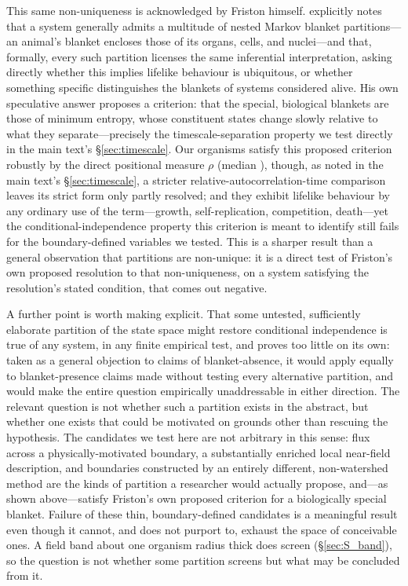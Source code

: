 \documentclass[11pt]{article}
\begin{document}
This same non-uniqueness is acknowledged by Friston himself. \citet{Friston2013} explicitly notes that a system generally admits a multitude of nested Markov blanket partitions---an animal's blanket encloses those of its organs, cells, and nuclei---and that, formally, every such partition licenses the same inferential interpretation, asking directly whether this implies lifelike behaviour is ubiquitous, or whether something specific distinguishes the blankets of systems considered alive. His own speculative answer proposes a criterion: that the special, biological blankets are those of minimum entropy, whose constituent states change slowly relative to what they separate---precisely the timescale-separation property we test directly in the main text's \S\ref{sec:timescale}. Our organisms satisfy this proposed criterion robustly by the direct positional measure $\rho$ (median ), though, as noted in the main text's \S\ref{sec:timescale}, a stricter relative-autocorrelation-time comparison leaves its strict form only partly resolved; and they exhibit lifelike behaviour by any ordinary use of the term---growth, self-replication, competition, death---yet the conditional-independence property this criterion is meant to identify still fails for the boundary-defined variables we tested. This is a sharper result than a general observation that partitions are non-unique: it is a direct test of Friston's own proposed resolution to that non-uniqueness, on a system satisfying the resolution's stated condition, that comes out negative.

A further point is worth making explicit. That some untested, sufficiently elaborate partition of the state space might restore conditional independence is true of any system, in any finite empirical test, and proves too little on its own: taken as a general objection to claims of blanket-absence, it would apply equally to blanket-presence claims made without testing every alternative partition, and would make the entire question empirically unaddressable in either direction. The relevant question is not whether such a partition exists in the abstract, but whether one exists that could be motivated on grounds other than rescuing the hypothesis. The candidates we test here are not arbitrary in this sense: flux across a physically-motivated boundary, a substantially enriched local near-field description, and boundaries constructed by an entirely different, non-watershed method are the kinds of partition a researcher would actually propose, and---as shown above---satisfy Friston's own proposed criterion for a biologically special blanket. Failure of these thin, boundary-defined candidates is a meaningful result even though it cannot, and does not purport to, exhaust the space of conceivable ones. A field band about one organism radius thick does screen (\S\ref{sec:S_band}), so the question is not whether some partition screens but what may be concluded from it.
\end{document}
